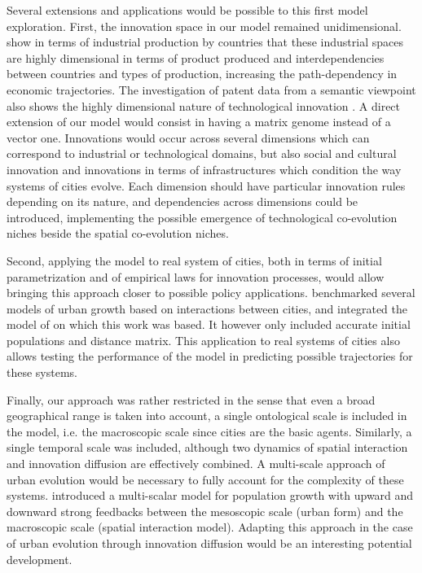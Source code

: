\documentclass[letterpaper]{article}
\begin{document}
Several extensions and applications would be possible to this first model exploration. First, the innovation space in our model remained unidimensional. \citep{hidalgo2007product} show in terms of industrial production by countries that these industrial spaces are highly dimensional in terms of product produced and interdependencies between countries and types of production, increasing the path-dependency in economic trajectories. The investigation of patent data from a semantic viewpoint also shows the highly dimensional nature of technological innovation \citep{bergeaud2017classifying}. A direct extension of our model would consist in having a matrix genome instead of a vector one. Innovations would occur across several dimensions which can correspond to industrial or technological domains, but also social and cultural innovation and innovations in terms of infrastructures which condition the way systems of cities evolve. Each dimension should have particular innovation rules depending on its nature, and dependencies across dimensions could be introduced, implementing the possible emergence of technological co-evolution niches beside the spatial co-evolution niches.

Second, applying the model to real system of cities, both in terms of initial parametrization and of empirical laws for innovation processes, would allow bringing this approach closer to possible policy applications. \cite{raimbault:halshs-01880492} benchmarked several models of urban growth based on interactions between cities, and integrated the model of \cite{favaro2011gibrat} on which this work was based. It however only included accurate initial populations and distance matrix. This application to real systems of cities also allows testing the performance of the model in predicting possible trajectories for these systems.

Finally, our approach was rather restricted in the sense that even a broad geographical range is taken into account, a single ontological scale is included in the model, i.e. the macroscopic scale since cities are the basic agents. Similarly, a single temporal scale was included, although two dynamics of spatial interaction and innovation diffusion are effectively combined. A multi-scale approach of urban evolution would be necessary to fully account for the complexity of these systems. \cite{raimbault:halshs-02351722} introduced a multi-scalar model for population growth with upward and downward strong feedbacks between the mesoscopic scale (urban form) and the macroscopic scale (spatial interaction model). Adapting this approach in the case of urban evolution through innovation diffusion would be an interesting potential development.
\end{document}
